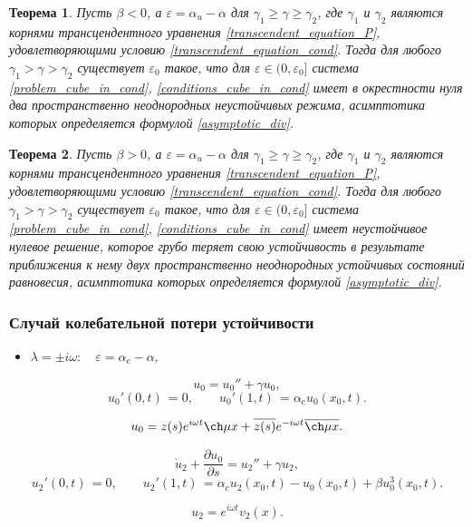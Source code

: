 \documentclass[fullscreen=true, unicode, bookmarks=false]{beamer}
\newtheorem{rustheorem}{Теорема }
\begin{document}
\begin{frame}

\begin{rustheorem}
Пусть $\beta<0$, а $ \varepsilon = \alpha_u - \alpha $ для $\gamma_1 \geqslant \gamma \geqslant \gamma_2$, где $\gamma_1$ и $\gamma_2$ являются корнями трансцендентного уравнения \eqref{transcendent_equation_P}, удовлетворяющими условию \eqref{transcendent_equation_cond}. Тогда для любого $\gamma_1 > \gamma > \gamma_2$ существует $ \varepsilon_0 $ такое, что для $ \varepsilon \in (0, \varepsilon_0] $ система \eqref{problem_cube_in_cond}, \eqref{conditions_cube_in_cond} имеет в окрестности нуля два пространственно неоднородных неустойчивых режима, асимптотика которых определяется формулой \eqref{asymptotic_div}.
\end{rustheorem}
\begin{rustheorem}
Пусть $\beta>0$, а $ \varepsilon = \alpha_u - \alpha $ для $\gamma_1 \geqslant \gamma \geqslant \gamma_2$, где $\gamma_1$ и $\gamma_2$ являются корнями трансцендентного уравнения \eqref{transcendent_equation_P}, удовлетворяющими условию \eqref{transcendent_equation_cond}. Тогда для любого $\gamma_1 > \gamma > \gamma_2$ существует $\varepsilon_0$ такое, что для $\varepsilon \in (0, \varepsilon_0]$ система \eqref{problem_cube_in_cond}, \eqref{conditions_cube_in_cond} имеет неустойчивое нулевое решение, которое грубо теряет свою устойчивость в результате приближения к нему двух пространственно неоднородных устойчивых состояний равновесия, асимптотика которых определяется формулой \eqref{asymptotic_div}.
\end{rustheorem}

\end{frame}

\begin{frame}
\frametitle{ Случай колебательной потери устойчивости }

\begin{itemize}
\item { $ \lambda = \pm i \omega: \quad \varepsilon=\alpha_c-\alpha, $
}
\end{itemize}

\vfill

$$
u_0 = u_0'' + \gamma u_0,
$$
$$
u_0'(0, t) \, = 0, \qquad u_0'(1, t) \, = \alpha_c u_0(x_0, t).
$$

$$ u_0 = z(s) e^{i \omega t} \ch \mu x + \overline{z(s)} e^{-i \omega t} \overline{\ch \mu x}. $$

\vfill

$$
\dot u_2 + \frac{\partial u_0}{\partial s} = u_2'' + \gamma u_2,
$$
$$
u_2'(0, t) \, = 0, \qquad u_2'(1, t) \, = \alpha_c u_2(x_0, t) - u_0(x_0, t) + \beta u_0^3(x_0, t).
$$

\vfill

$$ u_2 = e^{i \omega t} v_2(x). $$

\end{frame}
\end{document}
